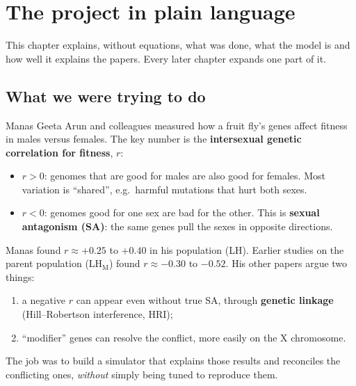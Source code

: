 \chapter{The project in plain language}\label{ch:summary}
This chapter explains, without equations, what was done, what the model is and how well it explains the papers. Every later chapter expands one part of it.

\section{What we were trying to do}
Manas Geeta Arun and colleagues measured how a fruit fly's genes affect fitness in males versus females. The key number is the \textbf{intersexual genetic correlation for fitness}, $r$:
\begin{itemize}
\item $r>0$: genomes that are good for males are also good for females. Most variation is ``shared'', e.g.\ harmful mutations that hurt both sexes.
\item $r<0$: genomes good for one sex are bad for the other. This is \textbf{sexual antagonism (SA)}: the same genes pull the sexes in opposite directions.
\end{itemize}
Manas found $r\approx+0.25$ to $+0.40$ in his population (LH). Earlier studies on the parent population (LH$_\mathrm{M}$) found $r\approx-0.30$ to $-0.52$. His other papers argue two things:
\begin{enumerate}
\item a negative $r$ can appear even without true SA, through \textbf{genetic linkage} (Hill--Robertson interference, HRI);
\item ``modifier'' genes can resolve the conflict, more easily on the X chromosome.
\end{enumerate}
The job was to build a simulator that explains those results and reconciles the conflicting ones, \emph{without} simply being tuned to reproduce them.

